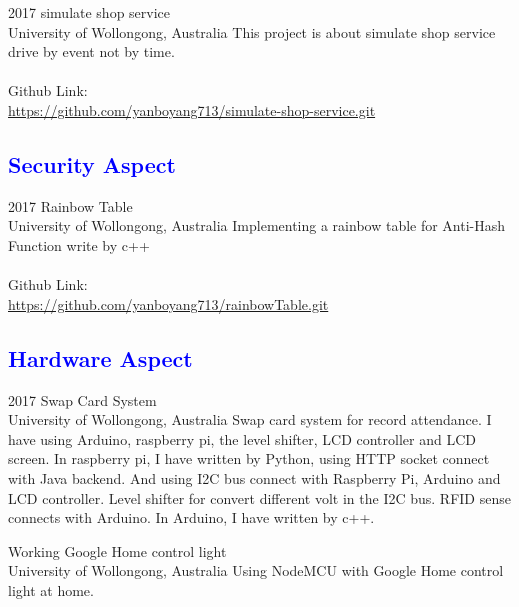 \documentclass[]{friggeri-cv}
\begin{document}
\begin{entrylist}
  \entry
    {2017}
    {simulate shop service\\}
    {University of Wollongong, Australia}
    {This project is about simulate shop service drive by event not by time.
     \\\\ Github Link: \\{\small\url{https://github.com/yanboyang713/simulate-shop-service.git}}}
\end{entrylist}

\subsection*{\textcolor{blue}{Security Aspect}}

\begin{entrylist}
  \entry
    {2017}
    {Rainbow Table\\}
    {University of Wollongong, Australia}
    {Implementing a rainbow table for Anti-Hash Function write by c++
    \\\\ Github Link: \\{\small\url{https://github.com/yanboyang713/rainbowTable.git}}}
\end{entrylist}

\subsection*{\textcolor{blue}{Hardware Aspect}}

\begin{entrylist}
  \entry
    {2017}
    {Swap Card System\\}
    {University of Wollongong, Australia}
    {Swap card system for record attendance. I have using Arduino, raspberry pi, the level shifter, LCD controller and LCD screen. In raspberry pi, I have written by Python, using HTTP socket connect with Java backend. And using I2C bus connect with Raspberry Pi, Arduino and LCD controller. Level shifter for convert different volt in the I2C bus. RFID sense connects with Arduino. In Arduino, I have written by c++.}
\end{entrylist}

\begin{entrylist}
  \entry
    {Working}
    {Google Home control light\\}
    {University of Wollongong, Australia}
    {Using NodeMCU with Google Home control light at home.}
\end{entrylist}
\end{document}
